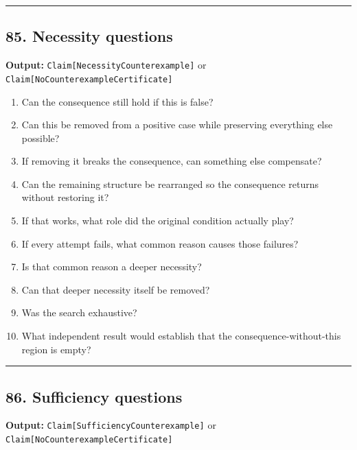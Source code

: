 \documentclass[
]{article}
\providecommand{\tightlist}{%
  \setlength{\itemsep}{0pt}\setlength{\parskip}{0pt}}
\begin{document}
\begin{center}\rule{0.5\linewidth}{0.5pt}\end{center}

\subsection{85. Necessity questions}\label{necessity-questions}

\textbf{Output:} \texttt{Claim{[}NecessityCounterexample{]}} or
\texttt{Claim{[}NoCounterexampleCertificate{]}}

\begin{enumerate}
\def\labelenumi{\arabic{enumi}.}
\tightlist
\item
  Can the consequence still hold if this is false?
\item
  Can this be removed from a positive case while preserving everything
  else possible?
\item
  If removing it breaks the consequence, can something else compensate?
\item
  Can the remaining structure be rearranged so the consequence returns
  without restoring it?
\item
  If that works, what role did the original condition actually play?
\item
  If every attempt fails, what common reason causes those failures?
\item
  Is that common reason a deeper necessity?
\item
  Can that deeper necessity itself be removed?
\item
  Was the search exhaustive?
\item
  What independent result would establish that the
  consequence-without-this region is empty?
\end{enumerate}

\begin{center}\rule{0.5\linewidth}{0.5pt}\end{center}

\subsection{86. Sufficiency questions}\label{sufficiency-questions}

\textbf{Output:} \texttt{Claim{[}SufficiencyCounterexample{]}} or
\texttt{Claim{[}NoCounterexampleCertificate{]}}
\end{document}
